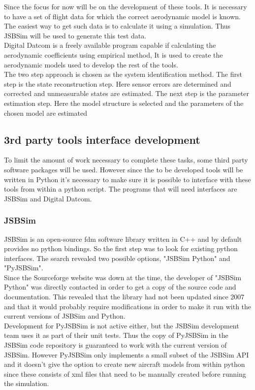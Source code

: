 Since the focus for now will be on the development of these tools. It is necessary to have a set of flight data for which the correct aerodynamic model is known. The easiest way to get such data is to calculate it using a simulation. Thus JSBSim will be used to generate this test data.\\

Digital Datcom is a freely available program capable if calculating the aerodynamic coefficients using empirical method, It is used to create the aerodynamic models used to develop the rest of the tools.\\

The two step approach is chosen as the system identification method. The first step is the state reconstruction step. Here sensor errors are determined and corrected and unmeasurable states are estimated. The next step is the parameter estimation step. Here the model structure is selected and the parameters of the chosen model are estimated 

\subsection{3rd party tools interface development}
To limit the amount of work necessary to complete these tasks, some third party software packages will be used. However since the to be developed tools will be written in Python it's necessary to make sure it is possible to interface with these tools from within a python script. The programs that will need interfaces are JSBSim and Digital Datcom.

\subsubsection{JSBSim}
JSBSim is an open-source \gls{fdm} software library written in C++ and by default provides no python bindings. So the first step was to look for existing python interfaces. The search revealed two possible options, "JSBSim Python" and "PyJSBSim". \\

Since the Sourceforge website was down at the time, the developer of "JSBSim Python" was directly contacted in order to get a copy of the source code and documentation. This revealed that the library had not been updated since 2007 and that it would probably require modifications in order to make it run with the current versions of JSBSim and Python. \\

Development for PyJSBSim is not active either, but the JSBSim development team uses it as part of their unit tests. Thus the copy of PyJSBSim in the JSBSim code repository is guaranteed to work with the current version of JSBSim. However PyJSBSim only implements a small subset of the JSBSim API and it doesn't give the option to create new aircraft models from within python since these consists of \gls{xml} files that need to be manually created before running the simulation. \\

